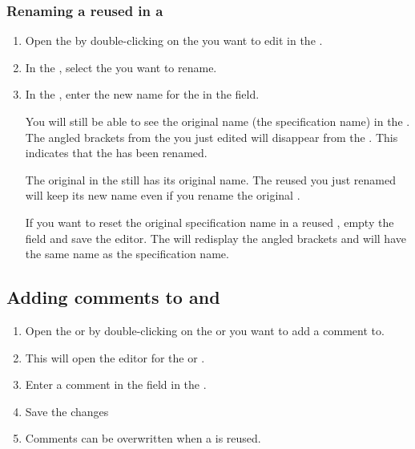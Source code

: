 \subsubsection{Renaming a reused \gdcase{} in a \gdsuite{}}
\begin{enumerate}
\item Open the \gdtestsuiteeditor{} by double-clicking on the \gdsuite{} you want to edit in the \gdtestsuitebrowser{}. 
\item In the \gdtestsuiteeditor{}, select the \gdcase{} you want to rename.
\item In the \gdpropview{}, enter the new name for the \gdcase{} in the  field. 

You will still be able to see the original \gdcase{} name (the specification name) in the \gdpropview{}. The angled brackets from the \gdcase{} you just edited will disappear from the \gdtestsuiteeditor{}. This indicates that the \gdcase{} has been renamed. 

The original \gdcase{} in the \gdtestcasebrowser{} still has its original name. The reused \gdcase{} you just renamed will keep its new name even if you rename the original \gdcase{}. 

If you want to reset the original specification name in a reused \gdcase{}, empty the  field and save the editor. The \gdcase{} will redisplay the angled brackets and will have the same name as the specification name.  
\end{enumerate}


\subsection{Adding comments to \gdcases{} and \gdsuites{}}
\label{taskscomment}
\begin{enumerate}
\item Open the \gdtestcaseeditor{} or \gdsuiteeditor{} by double-clicking on the  \gdcase{} or \gdsuite{} you want to add a comment to.
\item This will open the editor for the \gdcase{} or \gdsuite{}. 
\item Enter a comment in the  field in the  \gdpropview{}. 
\item Save the changes
\item Comments can be overwritten when a \gdcase{} is reused.
\end{enumerate}


